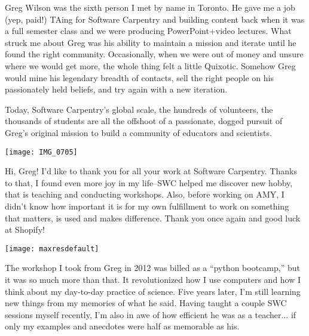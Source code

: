 Greg Wilson was the sixth person I met by name in Toronto. He gave me a job
(yep, paid!) TAing for Software Carpentry and building content back when it was
a full semester class and we were producing PowerPoint+video lectures. What
struck me about Greg was his ability to maintain a mission and iterate until he
found the right community. Occasionally, when we were out of money and unsure
where we would get more, the whole thing felt a little Quixotic. Somehow Greg
would mine his legendary breadth of contacts, sell the right people on his
passionately held beliefs, and try again with a new iteration. 

Today, Software Carpentry's global scale, the hundreds of volunteers, the
thousands of students are all the offshoot of a passionate, dogged pursuit of
Greg's original mission to build a community of educators and scientists.

\vspace*{\fill}

\newpage

\begin{center}
\texttt{[image: IMG\_0705]}
\end{center}

Hi, Greg! I'd like to thank you for all your work at Software Carpentry. Thanks
to that, I found even more joy in my life--SWC helped me discover new hobby,
that is teaching and conducting workshops. Also, before working on AMY, I
didn't know how important it is for my own fulfillment to work on something
that matters, is used and makes difference. Thank you once again and good luck
at Shopify!


\newpage
\vspace*{\fill}
\texttt{[image: maxresdefault]}

The workshop I took from Greg in 2012 was billed as a ``python bootcamp,'' but
it was so much more than that.  It revolutionized how I use computers and how I
think about my day-to-day practice of science.  Five years later, I'm still
learning new things from my memories of what he said.  Having taught a couple
SWC sessions myself recently, I'm also in awe of how efficient he was as a
teacher...  if only my examples and anecdotes were half as memorable as his.

\vspace*{\fill}

\newpage


